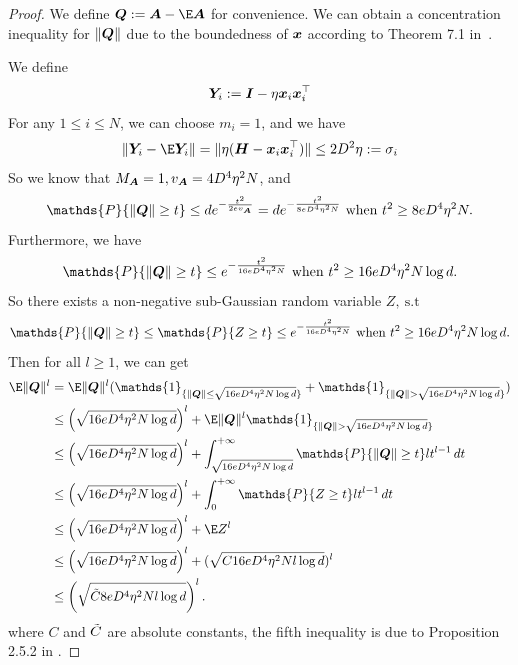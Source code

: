 \begin{proof}
    We define $\mQ:= \mA-\E\mA$ for convenience. 
    We can obtain a concentration inequality for $\|{\bm{Q}}\|$ due to the boundedness of ${\bm{x}}$ according to Theorem 7.1 in~\citet{huang2022matrix}.
    
    We define \[{\bm{Y}}_i := {\bm{I}}-\eta {\bm{x}}_i{\bm{x}}_i^{\top}\]
    For any $1 \leq i \leq N$, we can choose $m_i = 1$, and we have \[\|\mY_i - \E\mY_i\| = \|\eta(\mH-\vx_i\vx_i^{\top})\|\leq 2D^2\eta:=\sigma_i\]
    So we know that $M_{{\bm{A}}} = 1, v_{{\bm{A}}} = 4D^4\eta^2N$, and
    \[\mathds{P}\{\|\mQ\|\geq t\}\leq de^{-\frac{t^2}{2ev_{\mA}}}=de^{-\frac{t^2}{8eD^4\eta^2N}} \ \text{when} \ t^2 \geq 8eD^4\eta^2N.\]
    Furthermore, we have \[\mathds{P}\{\|\mQ\|\geq t\}\leq e^{-\frac{t^2}{16eD^4\eta^2N}} \ \text{when} \ t^2 \geq 16eD^4\eta^2N\log d.\]
    So there exists a non-negative sub-Gaussian random variable $Z, \ \text{s.t}$
    \[\mathds{P}\{\|\mQ\|\geq t\}\leq \mathds{P}\{Z\geq t\}\leq e^{-\frac{t^2}{16eD^4\eta^2N}} \ \text{when} \ t^2 \geq 16eD^4\eta^2N\log d.\]
    Then for all $l\geq1$, we can get 
    \begin{align*}
        \E\|\mQ\|^l &= \E\|\mQ\|^l(\mathds{1}_{\{\|\mQ\|\leq\sqrt{16eD^4\eta^2N\log d}\}}+\mathds{1}_{\{\|\mQ\|>\sqrt{16eD^4\eta^2N\log d}\}}) \\
        &\leq\left(\sqrt{16eD^4\eta^2N\log d}\right)^l+ \E\|\mQ\|^l\mathds{1}_{\{\|\mQ\|>\sqrt{16eD^4\eta^2N\log d}\}} \\
        &\leq \left(\sqrt{16eD^4\eta^2N\log d}\right)^l + \int_{\sqrt{16eD^4\eta^2N\log d}}^{+\infty} \mathds{P}\{\|\mQ\|\geq t\} lt^{l-1} \,dt \\
        &\leq \left(\sqrt{16eD^4\eta^2N\log d}\right)^l+ \int_{0}^{+\infty} \mathds{P}\{Z\geq t\} lt^{l-1} \,dt \\
        &\leq \left(\sqrt{16eD^4\eta^2N\log d}\right)^l+ \E Z^{l} \\
        &\leq \left(\sqrt{16eD^4\eta^2N\log d}\right)^l+(\sqrt{C16eD^4\eta^2Nl\log d})^l \\
        &\leq \left(\sqrt{\Tilde{C}8eD^4\eta^2Nl\log d }\right)^l.
    \end{align*}
    where $C$ and $\Tilde{C}$ are absolute constants, the fifth inequality is due to Proposition 2.5.2 in \citep{vershynin2018high}.
\end{proof}
